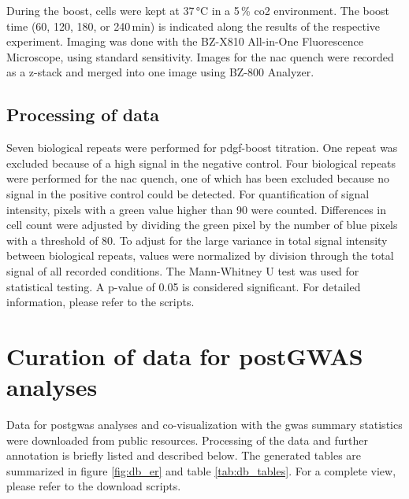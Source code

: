     During the boost, cells were kept at 37\,°C in a 5\,\% \ac{co2} environment. The boost time (60, 120, 180, or 240\,min) is indicated along the results of the respective experiment. Imaging was done with the BZ-X810 All-in-One Fluorescence Microscope, using standard sensitivity. Images for the \acf{nac} quench were recorded as a z-stack and merged into one image using BZ-800 Analyzer.

    \subsection{Processing of data}
    \label{subsec:cellrox_data_processing}
    Seven biological repeats were performed for \ac{pdgf}-boost titration. One repeat was excluded because of a high signal in the negative control. Four biological repeats were performed for the \ac{nac} quench, one of which has been excluded because no signal in the positive control could be detected.
    For quantification of signal intensity, pixels with a green value higher than 90 were counted. Differences in cell count were adjusted by dividing the green pixel by the number of blue pixels with a threshold of 80. To adjust for the large variance in total signal intensity between biological repeats, values were normalized by division through the total signal of all recorded conditions.
    The Mann-Whitney U test was used for statistical testing. A p-value of 0.05 is considered significant. For detailed information, please refer to the scripts.

\section{Curation of data for postGWAS analyses}
\label{sec:database}
Data for post\ac{gwas} analyses and co-visualization with the \ac{gwas} summary statistics were downloaded from public resources. Processing of the data and further annotation is briefly listed and described below. The generated tables are summarized in figure \ref{fig:db_er} and table \ref{tab:db_tables}. For a complete view, please refer to the download scripts.

